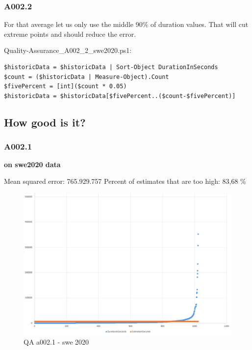 \hypertarget{a002.2}{%
\subsubsection{A002.2}}

For that average let us only use the middle 90\% of duration values.
That will cut extreme points and should reduce the error.

Quality-Assurance\_A002\_2\_swe2020.ps1:

\begin{verbatim}
$historicData = $historicData | Sort-Object DurationInSeconds
$count = ($historicData | Measure-Object).Count
$fivePercent = [int]($count * 0.05)
$historicData = $historicData[$fivePercent..($count-$fivePercent)]
\end{verbatim}

\hypertarget{how-good-is-it}{%
\subsection{How good is it?}}

\hypertarget{a002.1-1}{%
\subsubsection{A002.1}}

\textbf{on swe2020 data}

Mean squared error: 765.929.757 Percent of estimates that are too high:
83,68 \%

\begin{figure}
\centering
\includegraphics[width=\textwidth]{Documentation/10000-A002/a002_1-swe2020.png}
\caption{QA a002.1 - swe 2020}
\end{figure}

